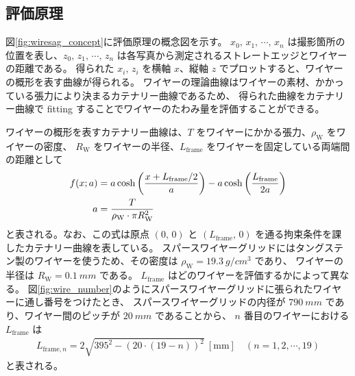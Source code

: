 \documentclass[../../main.tex]{subfiles}
\begin{document}
\subsection{評価原理}
図\ref{fig:wiresag_concept}に評価原理の概念図を示す。
$x_{0},\,x_{1},\,\cdots,\,x_{n}$ は撮影箇所の位置を表し、$z_{0},\,z_{1},\,\cdots,\,z_{n}$ は各写真から測定されるストレートエッジとワイヤーの距離である。
得られた $x_{i},\,z_{i}$ を横軸 $x$、縦軸 $z$ でプロットすると、ワイヤーの概形を表す曲線が得られる。
ワイヤーの理論曲線はワイヤーの素材、かかっている張力により決まるカテナリー曲線であるため、
得られた曲線をカテナリー曲線で fitting することでワイヤーのたわみ量を評価することができる。

ワイヤーの概形を表すカテナリー曲線は、$T$ をワイヤーにかかる張力、$\rho_{\mathrm{W}}$ をワイヤーの密度、
$R_{\mathrm{W}}$ をワイヤーの半径、$L_{\mathrm{frame}}$ をワイヤーを固定している両端間の距離として
\begin{align}
    f(x;a) &= a\cosh\qty(\dfrac{x+L_{\mathrm{frame}}/2}{a}) - a\cosh\qty(\dfrac{L_{\mathrm{frame}}}{2a}) \\
    a &= \dfrac{T}{\rho_{\mathrm{W}}\cdot\pi R_{\mathrm{W}}^2}
\end{align}
と表される。なお、この式は原点 $(0,\,0)$ と $(L_{\mathrm{frame}},\,0)$ を通る拘束条件を課したカテナリー曲線を表している。
スパースワイヤーグリッドにはタングステン製のワイヤーを使うため、その密度は $\rho_{\mathrm{W}}=\SI{19.3}{g/cm^3}$ であり、
ワイヤーの半径は $R_{\mathrm{W}}=\SI{0.1}{mm}$ である。
$L_{\mathrm{frame}}$ はどのワイヤーを評価するかによって異なる。
図\ref{fig:wire_number}のようにスパースワイヤーグリッドに張られたワイヤーに通し番号をつけたとき、
スパースワイヤーグリッドの内径が $\SI{790}{mm}$ であり、ワイヤー間のピッチが $\SI{20}{mm}$ であることから、
$n$ 番目のワイヤーにおける $L_{\mathrm{frame}}$ は
\begin{align}
    L_{\mathrm{frame}, n} = 2\sqrt{395^2-(20\cdot(19-n))^2}\ [\mathrm{mm}] \quad (n=1,2,\cdots,19)
\end{align}
と表される。
\end{document}
